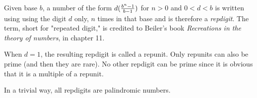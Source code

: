 \documentclass[12pt]{article}
\begin{document}
Given base $b$, a number of the form $d({{b^n - 1} \over {b - 1}})$ for $n > 0$ and $0 < d < b$ is written using using the digit $d$ only, $n$ times in that base and is therefore a {\em repdigit}. The term, short for "repeated digit," is credited to Beiler's book {\it Recreations in the theory of numbers}, in chapter 11.

When $d = 1$, the resulting repdigit is called a repunit. Only repunits can also be prime (and  then they are rare). No other repdigit can be prime since it is obvious that it is a multiple of a repunit.

In a trivial way, all repdigits are palindromic numbers.
\end{document}
